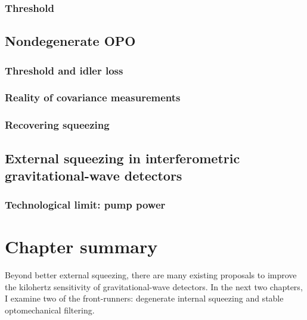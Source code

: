 

\subsubsection{Threshold}


\subsection{Nondegenerate OPO}


\subsubsection{Threshold and idler loss}

\subsubsection{Reality of covariance measurements}

\subsubsection{Recovering squeezing}

\subsection{External squeezing in interferometric gravitational-wave detectors}


\subsubsection{Technological limit: pump power} 

\section{Chapter summary}

Beyond better external squeezing, there are many  existing proposals to improve the kilohertz sensitivity of gravitational-wave detectors. In the next two chapters, I examine two of the front-runners: degenerate internal squeezing and stable optomechanical filtering.

